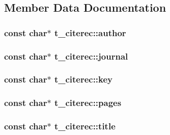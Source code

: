 \subsection{\-Member \-Data \-Documentation}
\hypertarget{structt__citerec_aade8af951818205d5e00609703750b43}{
\subsubsection[{author}]{\setlength{\rightskip}{0pt plus 5cm}const char$\ast$ {\bf t\-\_\-citerec\-::author}}}\label{structt__citerec_aade8af951818205d5e00609703750b43}
\hypertarget{structt__citerec_ac7a64e7c201cc4617a00bd32b42a3bc9}{
\subsubsection[{journal}]{\setlength{\rightskip}{0pt plus 5cm}const char$\ast$ {\bf t\-\_\-citerec\-::journal}}}\label{structt__citerec_ac7a64e7c201cc4617a00bd32b42a3bc9}
\hypertarget{structt__citerec_a67c7d4f94cb5d737e7911bd033f4ee65}{
\subsubsection[{key}]{\setlength{\rightskip}{0pt plus 5cm}const char$\ast$ {\bf t\-\_\-citerec\-::key}}}\label{structt__citerec_a67c7d4f94cb5d737e7911bd033f4ee65}
\hypertarget{structt__citerec_a7aa84959d007a6951a3f56ee0b0c2427}{
\subsubsection[{pages}]{\setlength{\rightskip}{0pt plus 5cm}const char$\ast$ {\bf t\-\_\-citerec\-::pages}}}\label{structt__citerec_a7aa84959d007a6951a3f56ee0b0c2427}
\hypertarget{structt__citerec_aa71e0c62a2e200272fb5b51f54ec6492}{
\subsubsection[{title}]{\setlength{\rightskip}{0pt plus 5cm}const char$\ast$ {\bf t\-\_\-citerec\-::title}}}\label{structt__citerec_aa71e0c62a2e200272fb5b51f54ec6492}
